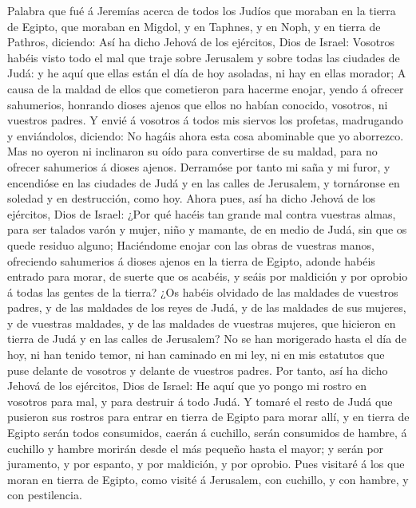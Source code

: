 Palabra que fué á Jeremías acerca de todos los Judíos que
moraban en la tierra de Egipto, que moraban en Migdol, y en Taphnes, y
en Noph, y en tierra de Pathros, diciendo:  Así ha dicho
Jehová de los ejércitos, Dios de Israel: Vosotros habéis visto todo el
mal que traje sobre Jerusalem y sobre todas las ciudades de Judá: y he
aquí que ellas están el día de hoy asoladas, ni hay en ellas morador;
 A causa de la maldad de ellos que cometieron para hacerme
enojar, yendo á ofrecer sahumerios, honrando dioses ajenos que ellos no
habían conocido, vosotros, ni vuestros padres.  Y envié á
vosotros á todos mis siervos los profetas, madrugando y enviándolos,
diciendo: No hagáis ahora esta cosa abominable que yo aborrezco.
 Mas no oyeron ni inclinaron su oído para convertirse de su
maldad, para no ofrecer sahumerios á dioses ajenos. 
Derramóse por tanto mi saña y mi furor, y encendióse en las ciudades de
Judá y en las calles de Jerusalem, y tornáronse en soledad y en
destrucción, como hoy.  Ahora pues, así ha dicho Jehová de
los ejércitos, Dios de Israel: ¿Por qué hacéis tan grande mal contra
vuestras almas, para ser talados varón y mujer, niño y mamante, de en
medio de Judá, sin que os quede residuo alguno;  Haciéndome
enojar con las obras de vuestras manos, ofreciendo sahumerios á dioses
ajenos en la tierra de Egipto, adonde habéis entrado para morar, de
suerte que os acabéis, y seáis por maldición y por oprobio á todas las
gentes de la tierra?  ¿Os habéis olvidado de las maldades de
vuestros padres, y de las maldades de los reyes de Judá, y de las
maldades de sus mujeres, y de vuestras maldades, y de las maldades de
vuestras mujeres, que hicieron en tierra de Judá y en las calles de
Jerusalem?  No se han morigerado hasta el día de hoy, ni
han tenido temor, ni han caminado en mi ley, ni en mis estatutos que
puse delante de vosotros y delante de vuestros padres.  Por
tanto, así ha dicho Jehová de los ejércitos, Dios de Israel: He aquí que
yo pongo mi rostro en vosotros para mal, y para destruir á todo Judá.
 Y tomaré el resto de Judá que pusieron sus rostros para
entrar en tierra de Egipto para morar allí, y en tierra de Egipto serán
todos consumidos, caerán á cuchillo, serán consumidos de hambre, á
cuchillo y hambre morirán desde el más pequeño hasta el mayor; y serán
por juramento, y por espanto, y por maldición, y por oprobio.
 Pues visitaré á los que moran en tierra de Egipto, como
visité á Jerusalem, con cuchillo, y con hambre, y con pestilencia.
